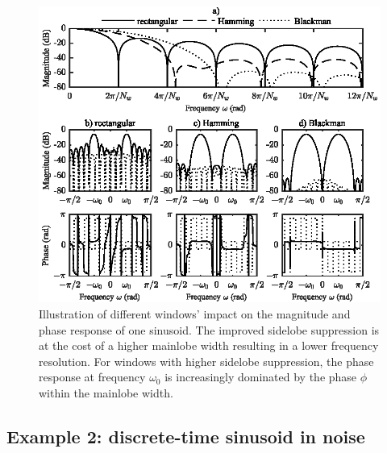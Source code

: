 \begin{figure}[t]
	\center %
	\includegraphics{figures/figure3_3.eps}
	\caption{Illustration of different windows' impact on the magnitude and phase response of one sinusoid. The improved sidelobe suppression is at the cost of a higher mainlobe width resulting in a lower frequency resolution. For windows with higher sidelobe suppression, the phase response at frequency $\omega_0$ is increasingly dominated by the phase $\phi$ within the mainlobe width.}\label{Figure33}
\end{figure}

\subsection{Example 2: discrete-time sinusoid in noise}~\\

